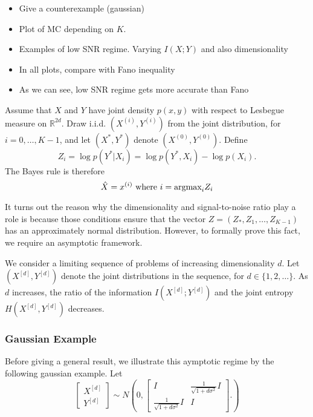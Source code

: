 \documentclass[12pt]{article}
\begin{document}
\begin{itemize}
\item Give a counterexample (gaussian)
\item Plot of $\text{MC}$ depending on $K$.
\item Examples of low SNR regime.  Varying $I(X;Y)$ and also dimensionality 
\item In all plots, compare with Fano inequality
\item As we can see, low SNR regime gets more accurate than Fano
\end{itemize}

Assume that $X$ and $Y$ have joint density $p(x, y)$ with respect to
Lesbegue measure on $\mathbb{R}^{2d}$.  Draw i.i.d. $(X^{(i)},
Y^{(i)})$ from the joint distribution, for $i = 0,\hdots, K-1$, and let
$(X^*, Y^*)$ denote $(X^{(0)}, Y^{(0)})$.  Define
\[
Z_i = \log p(Y^*|X_i) = \log p(Y^*, X_i) - \log p(X_i).
\]
The Bayes rule is therefore
\[
\hat{X} = x^{(i)} \text{ where }i = \text{argmax}_i Z_i
\]

It turns out the reason why the dimensionality and signal-to-noise
ratio play a role is because those conditions ensure that the vector
$Z = (Z_*, Z_1,\hdots, Z_{K-1})$ has an approximately normal
distribution.  However, to formally prove this fact, we require an
asymptotic framework.

We consider a limiting sequence of problems of increasing
dimensionality $d$.  Let $(X^{[d]}, Y^{[d]})$ denote the joint
distributions in the sequence, for $d \in \{1, 2, \hdots\}.$ As $d$
increases, the ratio of the information $I(X^{[d]}; Y^{[d]})$ and the
joint entropy $H(X^{[d]}, Y^{[d]})$ decreases.

\subsubsection{Gaussian Example}

Before giving a general result, we illustrate this aymptotic regime by
the following gaussian example.  Let
\[
\begin{bmatrix}
X^{[d]}\\Y^{[d]}
\end{bmatrix} \sim 
N\left(
0, \begin{bmatrix}
I & \frac{1}{\sqrt{1 + d\sigma^2}}I \\
\frac{1}{\sqrt{1 + d\sigma^2}} I & I
\end{bmatrix}.
\right)
\]
\end{document}

